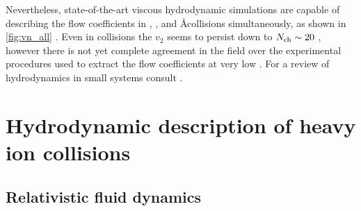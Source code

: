 Nevertheless, state-of-the-art viscous hydrodynamic simulations are capable of describing the flow coefficients in \pp, \pA, and \AA collisions simultaneously, as shown in \cref{fig:vn_all} \cite{Weller:2017tsr}.
Even in \pp collisions the $v_2$ seems to persist down to $\mbox{$N_{\mathrm{ch}}$} \sim 20$ \cite{HION-2016-01}, however there is not yet complete agreement in the field over the experimental procedures used to extract the flow coefficients at very low \Nch.
For a review of hydrodynamics in small systems consult .


\FloatBarrier

\section{Hydrodynamic description of heavy ion collisions}
\label{sec:hydro}

\subsection{Relativistic fluid dynamics}

